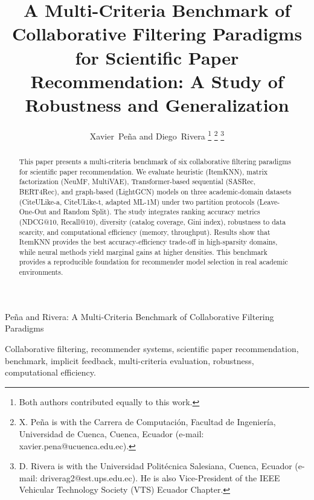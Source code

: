 \documentclass[journal]{IEEEtran}
\begin{document}
\title{A Multi-Criteria Benchmark of Collaborative Filtering Paradigms for Scientific Paper Recommendation: A Study of Robustness and Generalization}

\author{Xavier~Peña and Diego~Rivera%
\thanks{Both authors contributed equally to this work.}%
\thanks{X. Peña is with the Carrera de Computación, Facultad de Ingeniería, Universidad de Cuenca, Cuenca, Ecuador (e-mail: xavier.pena@ucuenca.edu.ec).}%
\thanks{D. Rivera is with the Universidad Politécnica Salesiana, Cuenca, Ecuador (e-mail: driverag2@est.ups.edu.ec). He is also Vice-President of the IEEE Vehicular Technology Society (VTS) Ecuador Chapter.}}

%
{Peña and Rivera: A Multi-Criteria Benchmark of Collaborative Filtering Paradigms}

\maketitle

\begin{abstract}
This paper presents a multi-criteria benchmark of six collaborative filtering paradigms for scientific paper recommendation. We evaluate heuristic (ItemKNN), matrix factorization (NeuMF, MultiVAE), Transformer-based sequential (SASRec, BERT4Rec), and graph-based (LightGCN) models on three academic-domain datasets (CiteULike-a, CiteULike-t, adapted ML-1M) under two partition protocols (Leave-One-Out and Random Split). The study integrates ranking accuracy metrics (NDCG@10, Recall@10), diversity (catalog coverage, Gini index), robustness to data scarcity, and computational efficiency (memory, throughput). Results show that ItemKNN provides the best accuracy-efficiency trade-off in high-sparsity domains, while neural methods yield marginal gains at higher densities. This benchmark provides a reproducible foundation for recommender model selection in real academic environments.
\end{abstract}

\begin{IEEEkeywords}
Collaborative filtering, recommender systems, scientific paper recommendation, benchmark, implicit feedback, multi-criteria evaluation, robustness, computational efficiency.
\end{IEEEkeywords}
\end{document}
